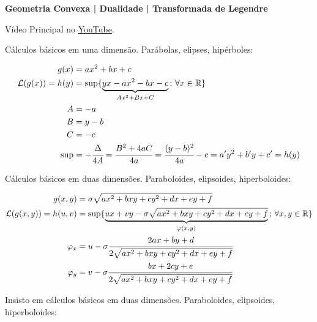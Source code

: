 \documentclass[12pt]{article}
\begin{document}
\Large

\begin{center}
\textbf{Geometria Convexa | Dualidade | Transformada de Legendre}
\end{center}

\large

V\'ideo Principal no \href{https://www.youtube.com/watch?v=mmzqmIcX7xo}{\color{blue}\underline{YouTube}}.

\vspace{3mm}

C\'alculos b\'asicos em uma dimens\~ao. Par\'abolas, elipses, hip\'erboles:

\begin{align}
g(x) &= ax^2 + bx + c \\
\mathcal{L}(g(x)) = h(y) &= \sup \{ \underbrace{yx - ax^2 - bx - c}_{Ax^2 + Bx + C}\,;\,\forall x \in \mathbb{R} \} \\
A &= -a \\
B &= y - b \\
C &= -c \\
\sup &= -\cfrac{\Delta}{4A} = \cfrac{B^2+4aC}{4a} = \cfrac{(y-b)^2}{4a} - c = a'y^2 + b'y + c' = h(y)
\end{align}

\vspace{3mm}

C\'alculos b\'asicos em duas dimens\~oes. Paraboloides, elipsoides, hiperboloides:

\begin{align}
g(x,y) &= \sigma \sqrt{ax^2 + bxy + cy^2 + dx + ey + f} \\
\mathcal{L}(g(x,y)) = h(u,v) &= \sup \{ \underbrace{ux + vy - \sigma \sqrt{ax^2 + bxy + cy^2 + dx + ey + f}}_{\varphi(x,y)}\,;\,\forall x,y \in \mathbb{R} \} \\
\varphi_x &= u - \sigma \cfrac{2ax + by + d}{2\sqrt{ax^2 + bxy + cy^2 + dx + ey + f}} \\
\varphi_y &= v - \sigma \cfrac{bx + 2cy + e}{2\sqrt{ax^2 + bxy + cy^2 + dx + ey + f}}
\end{align}

\vspace{300mm}

Insisto em c\'alculos b\'asicos em duas dimens\~oes. Paraboloides, elipsoides, hiperboloides:
\end{document}

